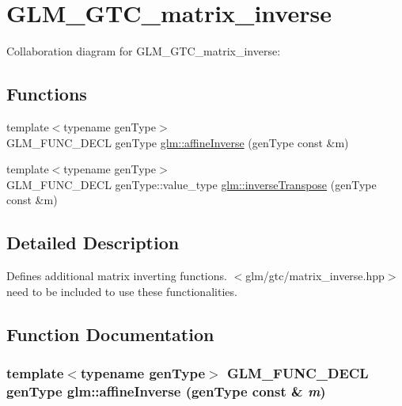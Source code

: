 \hypertarget{group__gtc__matrix__inverse}{
\section{GLM\_\-GTC\_\-matrix\_\-inverse}
\label{group__gtc__matrix__inverse}
}


Collaboration diagram for GLM\_\-GTC\_\-matrix\_\-inverse:\subsection*{Functions}
\begin{CompactItemize}
\item 
{\footnotesize template$<$typename genType$>$ }\\GLM\_\-FUNC\_\-DECL genType \hyperlink{group__gtc__matrix__inverse_g48364fa20265957b779a0708ae33f3dd}{glm::affineInverse} (genType const \&m)
\item 
{\footnotesize template$<$typename genType$>$ }\\GLM\_\-FUNC\_\-DECL genType::value\_\-type \hyperlink{group__gtc__matrix__inverse_g63a905c74c61422e84008d466f1e3c49}{glm::inverseTranspose} (genType const \&m)
\end{CompactItemize}


\subsection{Detailed Description}
Defines additional matrix inverting functions. $<$glm/gtc/matrix\_\-inverse.hpp$>$ need to be included to use these functionalities. 

\subsection{Function Documentation}
\hypertarget{group__gtc__matrix__inverse_g48364fa20265957b779a0708ae33f3dd}{
\subsubsection[affineInverse]{\setlength{\rightskip}{0pt plus 5cm}template$<$typename genType$>$ GLM\_\-FUNC\_\-DECL genType glm::affineInverse (genType const \& {\em m})}}
\label{group__gtc__matrix__inverse_g48364fa20265957b779a0708ae33f3dd}


